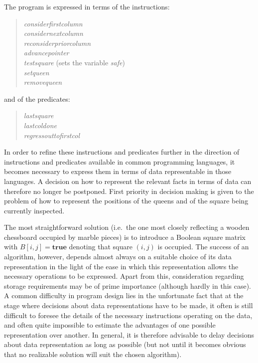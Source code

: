 The program is expressed in terms of the instructions:

\begin{quote}
\emph{considerfirstcolumn}\\
\emph{considernextcolumn}\\
\emph{reconsiderpriorcolumn}\\
\emph{advancepointer}\\
\emph{testsquare} (sets the variable \emph{safe})\\
\emph{setqueen}\\
\emph{removequeen}\\
\end{quote}

and of the predicates:

\begin{quote}
\emph{lastsquare}\\
\emph{lastcoldone}\\
\emph{regressouttofirstcol}\\
\end{quote}

In order to refine these instructions and predicates further in the direction
of instructions and predicates available in common programming languages, it
becomes necessary to express them in terms of data representable in those
languages.  A decision on how to represent the relevant facts in terms of data
can therefore no longer be postponed.  First priority in decision making is
given to the problem of how to represent the positions of the queens and of the
square being currently inspected.

The most straightforward solution (i.e.\ the one most closely reflecting a
wooden chessboard occupied by marble pieces) is to introduce a Boolean square
matrix with $B[i, j] = \textbf{true}$ denoting that square $(i, j)$ is
occupied.  The success of an algorithm, however, depends almost always on a
suitable choice of its data representation in the light of the ease in which
this representation allows the necessary operations to be expressed.  Apart
from this, consideration regarding storage requirements may be of prime
importance (although hardly in this case).  A common difficulty in program
design lies in the unfortunate fact that at the stage where decisions about
data representations have to be made, it often is still difficult to foresee
the details of the necessary instructions operating on the data, and often
quite impossible to estimate the advantages of one possible representation over
another.  In general, it is therefore advisable to delay decisions about data
representation as long as possible (but not until it becomes obvious that no
realizable solution will suit the chosen algorithm).

